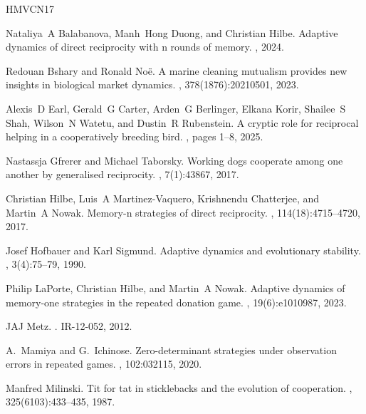 \documentclass{article}
\theoremstyle{definition}
\numberwithin{equation}{section}
\begin{document}
\begin{thebibliography}{HMVCN17}

Nataliya~A Balabanova, Manh~Hong Duong, and Christian Hilbe.
\newblock Adaptive dynamics of direct reciprocity with n rounds of memory.
, 2024.

Redouan Bshary and Ronald No{\"e}.
\newblock A marine cleaning mutualism provides new insights in biological market dynamics.
, 378(1876):20210501, 2023.

Alexis~D Earl, Gerald~G Carter, Arden~G Berlinger, Elkana Korir, Shailee~S Shah, Wilson~N Watetu, and Dustin~R Rubenstein.
\newblock A cryptic role for reciprocal helping in a cooperatively breeding bird.
, pages 1--8, 2025.

Nastassja Gfrerer and Michael Taborsky.
\newblock Working dogs cooperate among one another by generalised reciprocity.
, 7(1):43867, 2017.

Christian Hilbe, Luis~A Martinez-Vaquero, Krishnendu Chatterjee, and Martin~A Nowak.
\newblock Memory-n strategies of direct reciprocity.
, 114(18):4715--4720, 2017.

Josef Hofbauer and Karl Sigmund.
\newblock Adaptive dynamics and evolutionary stability.
, 3(4):75--79, 1990.

Philip LaPorte, Christian Hilbe, and Martin~A Nowak.
\newblock Adaptive dynamics of memory-one strategies in the repeated donation game.
, 19(6):e1010987, 2023.

JAJ Metz.
.
\newblock IR-12-052, 2012.

A.~Mamiya and G.~Ichinose.
\newblock Zero-determinant strategies under observation errors in repeated games.
, 102:032115, 2020.

Manfred Milinski.
\newblock Tit for tat in sticklebacks and the evolution of cooperation.
, 325(6103):433--435, 1987.


\end{thebibliography}
\end{document}
